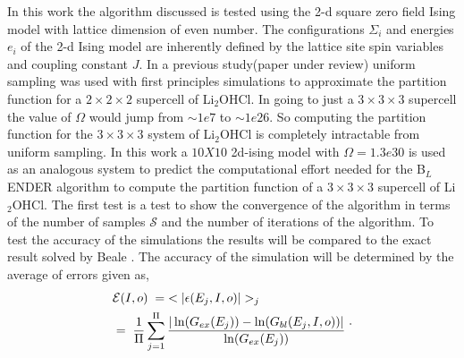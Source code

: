 \documentclass[aps,prl,reprint,superscriptaddress,showkeys]{revtex4-1}
\begin{document}
In this work the algorithm discussed is tested using the 2-d square zero field  Ising model with lattice dimension of even number\cite{exact_statistical,Onsager,Ising}.  The configurations $\Sigma_i$ and energies $e_i$ of the 2-d Ising model are inherently defined by the lattice site spin variables and coupling constant $J$. In a previous study(paper under review) uniform sampling was used with first principles simulations to approximate the partition function for a $2\times 2\times 2$ supercell  of Li$_2$OHCl. In going to just a $3\times 3\times 3$ supercell the value of $\Omega$ would jump from $\sim1e7$ to  $\sim1e26$. So computing the partition function for the $3\times 3\times 3$ system of Li$_2$OHCl is completely intractable from uniform sampling. In this work a $10X10$ 2d-ising model with $\Omega = 1.3e30$ is used as an analogous system to predict the computational effort needed for the B$_L$ENDER algorithm to compute the partition function of a  $3\times 3\times 3$ supercell of Li$_2$OHCl.  The first test is a test to show the convergence of the algorithm in terms of the number of samples $\mathcal{S}$ and the number of iterations of the algorithm. To test the accuracy of the simulations the results will be compared to the exact result solved by Beale \cite{Beale_2d_ising}. The accuracy of the simulation will be determined by the average of errors given as, 
\begin{equation}
\begin{split}
 &\mathcal{E}(I,o) \hspace{0.1cm}= \hspace{0.1cm}< |\epsilon(E_j,I,o)| >_j\\
& = \hspace{0.1cm}  \frac{1}{\Pi} \sum_{j=1}^{\Pi}\frac{|\ln(G_{ex}(E_j))- \ln(G_{bl}(E_j,I,o))|}{\ln(G_{ex}(E_j))}\; 
 \end{split}. 
\end{equation}
\end{document}
